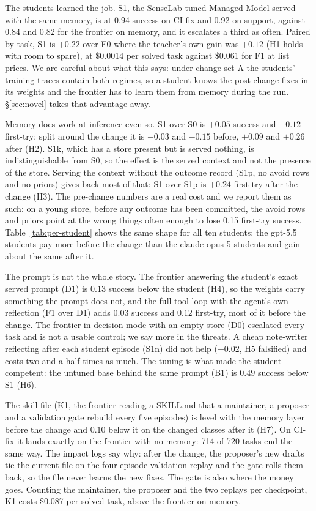 \documentclass[11pt]{article}
\newcommand{\cond}[1]{\textsf{#1}}
\begin{document}
The students learned the job. \cond{S1}, the SenseLab-tuned Managed Model served with the
same memory, is at 0.94 success on CI-fix and 0.92 on support, against 0.84 and 0.82 for
the frontier on memory, and it escalates a third as often. Paired by task, \cond{S1} is
$+0.22$ over \cond{F0} where the teacher's own gain was $+0.12$ (H1 holds with room to
spare), at \$0.0014 per solved task against \$0.061 for \cond{F1} at list prices. We are
careful about what this says: under change set A the students' training traces contain both
regimes, so a student knows the post-change fixes in its weights and the frontier has to
learn them from memory during the run. \S\ref{sec:novel} takes that advantage away.

Memory does work at inference even so. \cond{S1} over \cond{S0} is $+0.05$ success and
$+0.12$ first-try; split around the change it is $-0.03$ and $-0.15$ before, $+0.09$ and
$+0.26$ after (H2). \cond{S1k}, which has a store present but is served nothing, is
indistinguishable from \cond{S0}, so the effect is the served context and not the presence
of the store. Serving the context without the outcome record (\cond{S1p}, no avoid rows and
no priors) gives back most of that: \cond{S1} over \cond{S1p} is $+0.24$ first-try after the
change (H3). The pre-change numbers are a real cost and we report them as such: on a young
store, before any outcome has been committed, the avoid rows and priors point at the wrong
things often enough to lose 0.15 first-try success. Table~\ref{tab:per-student} shows the same
shape for all ten students; the gpt-5.5 students pay more before the change than the
claude-opus-5 students and gain about the same after it.

The prompt is not the whole story. The frontier answering the student's exact served prompt
(\cond{D1}) is $0.13$ success below the student (H4), so the weights carry something the
prompt does not, and the full tool loop with the agent's own reflection (\cond{F1} over
\cond{D1}) adds $0.03$ success and $0.12$ first-try, most of it before the change. The
frontier in decision mode with an empty store (\cond{D0}) escalated every task and is not a
usable control; we say more in the threats. A cheap note-writer reflecting after each
student episode (\cond{S1n}) did not help ($-0.02$, H5 falsified) and costs two and a half
times as much. The tuning is what made the student competent: the untuned
base behind the same prompt (\cond{B1}) is $0.49$ success below \cond{S1} (H6).

The skill file (\cond{K1}, the frontier reading a SKILL.md that a maintainer, a proposer and
a validation gate rebuild every five episodes) is level with the memory layer before the
change and $0.10$ below it on the changed classes after it (H7). On CI-fix it lands exactly
on the frontier with no memory: 714 of 720 tasks end the same way. The impact logs say why:
after the change, the proposer's new drafts tie the current file on the four-episode
validation replay and the gate rolls them back, so the file never learns the new fixes. The
gate is also where the money goes. Counting the maintainer, the proposer and the two replays
per checkpoint, \cond{K1} costs \$0.087 per solved task, above the frontier on memory.
\end{document}
